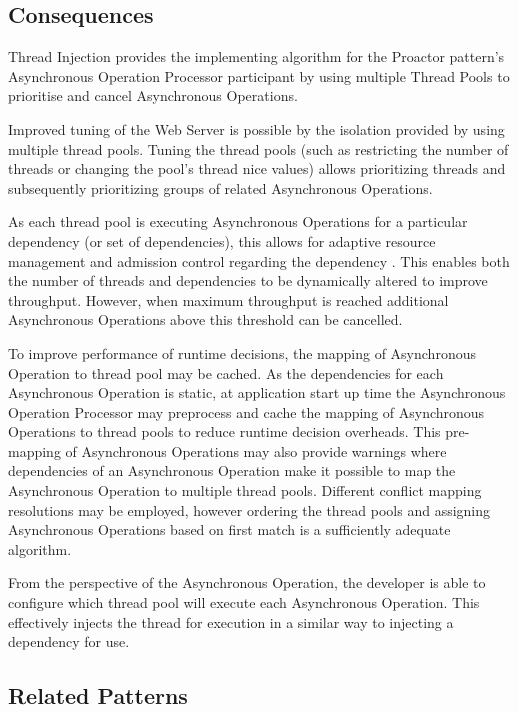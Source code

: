 \documentclass[prodmode]{style/acmlarge}
\begin{document}
\subsection{Consequences}

Thread Injection provides the implementing algorithm for the Proactor pattern's
Asynchronous Operation Processor participant by using multiple Thread Pools to
prioritise and cancel Asynchronous Operations.

Improved tuning of the Web Server is possible by the isolation provided by using
multiple thread pools.  Tuning the thread pools (such as restricting the number
of threads or changing the pool's thread nice values) allows prioritizing
threads and subsequently prioritizing groups of related Asynchronous Operations.

As each thread pool is executing Asynchronous Operations for a particular
dependency (or set of dependencies), this allows for adaptive resource
management and admission control regarding the dependency \cite{seda}.  This
enables both the number of threads and dependencies to be dynamically altered to
improve throughput.  However, when maximum throughput is reached additional
Asynchronous Operations above this threshold can be cancelled.

To improve performance of runtime decisions, the mapping of Asynchronous
Operation to thread pool may be cached.  As the dependencies for each
Asynchronous Operation is static, at application start up time the Asynchronous
Operation Processor may preprocess and cache the mapping of Asynchronous
Operations to thread pools to reduce runtime decision overheads.  This
pre-mapping of Asynchronous Operations may also provide warnings where
dependencies of an Asynchronous Operation make it possible to map the
Asynchronous Operation to multiple thread pools.  Different conflict mapping
resolutions may be employed, however ordering the thread pools and assigning
Asynchronous Operations based on first match is a sufficiently adequate
algorithm.

From the perspective of the Asynchronous Operation, the developer is able to
configure which thread pool will execute each Asynchronous Operation.  This
effectively injects the thread for execution in a similar way to injecting a
dependency for use.


\subsection{Related Patterns}
\end{document}
